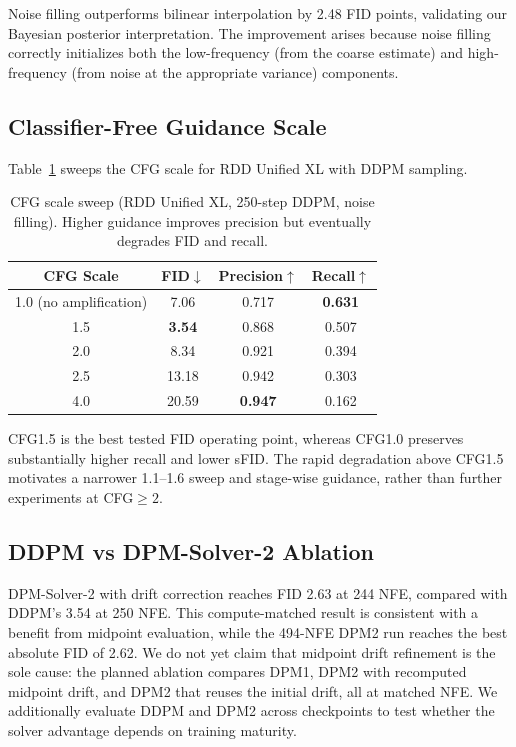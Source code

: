 \documentclass[10pt]{article}
\begin{document}
Noise filling outperforms bilinear interpolation by 2.48 FID points, validating our Bayesian posterior interpretation.
The improvement arises because noise filling correctly initializes both the low-frequency (from the coarse estimate) and high-frequency (from noise at the appropriate variance) components.

\subsection{Classifier-Free Guidance Scale}
\label{sec:cfg}

Table~\ref{tab:cfg} sweeps the CFG scale for RDD Unified XL with DDPM sampling.

\begin{table}[t]
\centering
\caption{CFG scale sweep (RDD Unified XL, 250-step DDPM, noise filling). Higher guidance improves precision but eventually degrades FID and recall.}
\label{tab:cfg}
\begin{tabular}{@{}cccc@{}}
\toprule
\textbf{CFG Scale} & \textbf{FID}$\downarrow$ & \textbf{Precision}$\uparrow$ & \textbf{Recall}$\uparrow$ \\
\midrule
1.0 (no amplification) & 7.06 & 0.717 & \textbf{0.631} \\
1.5 & \textbf{3.54} & 0.868 & 0.507 \\
2.0 & 8.34 & 0.921 & 0.394 \\
2.5 & 13.18 & 0.942 & 0.303 \\
4.0 & 20.59 & \textbf{0.947} & 0.162 \\
\bottomrule
\end{tabular}
\end{table}

CFG1.5 is the best tested FID operating point, whereas CFG1.0 preserves substantially higher recall and lower sFID.
The rapid degradation above CFG1.5 motivates a narrower 1.1--1.6 sweep and stage-wise guidance, rather than further experiments at CFG$\geq2$.

\subsection{DDPM vs DPM-Solver-2 Ablation}
\label{sec:ddpm_vs_dpm}

DPM-Solver-2 with drift correction reaches FID 2.63 at 244 NFE, compared with DDPM's 3.54 at 250 NFE.
This compute-matched result is consistent with a benefit from midpoint evaluation, while the 494-NFE DPM2 run reaches the best absolute FID of 2.62.
We do not yet claim that midpoint drift refinement is the sole cause: the planned ablation compares DPM1, DPM2 with recomputed midpoint drift, and DPM2 that reuses the initial drift, all at matched NFE.
We additionally evaluate DDPM and DPM2 across checkpoints to test whether the solver advantage depends on training maturity.
\end{document}
